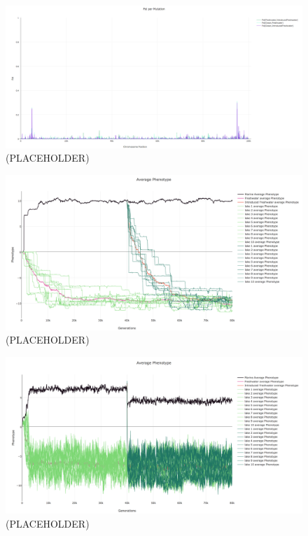 \documentclass{article}
\begin{document}
\begin{figure}[h!tb]
	\begin{center}
  		\includegraphics[width=0.7\linewidth]{plotlyPlots/FstAcross5e-2.png}
  		\caption{(PLACEHOLDER)
		}
  		\label{fig:Fst4}
	\end{center}
\end{figure}

\begin{figure}[h!tb]
	\begin{center}
  		\includegraphics[width=0.7\linewidth]{plotlyPlots/PhenotypeThroughout5e-5.png}
  		\caption{ (PLACEHOLDER)
		}
  		\label{fig:phenotype_ts1}
	\end{center}
\end{figure}

\begin{figure}[h!tb]
	\begin{center}
  		\includegraphics[width=0.7\linewidth]{plotlyPlots/PhenotypeThroughout5e-2.png}
  		\caption{(PLACEHOLDER)
		}
  		\label{fig:phenotype_ts4}
	\end{center}
\end{figure}
\end{document}
